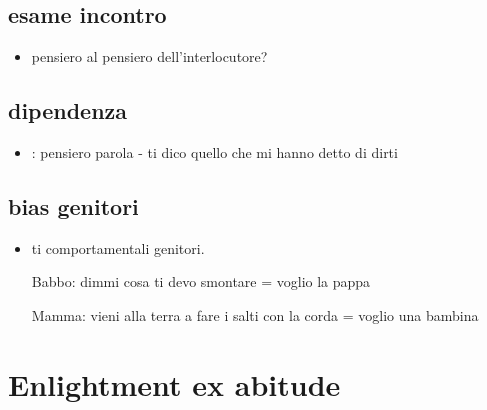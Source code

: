 \subsection{esame incontro}

\begin{itemize}

\item pensiero al pensiero dell'interlocutore?

\end{itemize}


\subsection{dipendenza}

\begin{itemize}

\item {}: pensiero parola - ti dico quello che mi hanno detto di dirti

\end{itemize}



\subsection{bias genitori}

\begin{itemize}

\item ti comportamentali genitori.

Babbo: dimmi cosa ti devo smontare = voglio la pappa
 
Mamma: vieni alla terra a fare i salti con la corda = voglio una bambina

\end{itemize}




\section{Enlightment ex abitude}


